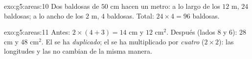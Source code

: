 \begin{solution}{exo:g5:areas:10}
Dos baldosas de $50$ cm hacen un metro: a lo largo de los $12$ m,
$24$ baldosas; a lo ancho de los $2$ m, $4$ baldosas. Total:
$24 \times 4 = 96$ baldosas.
\end{solution}

\begin{solution}{exo:g5:areas:11}
Antes:  $2 \times (4 + 3) = 14$ cm y  $12$ cm$^2$.
Después (lados $8$ y $6$):  $28$ cm y  $48$ cm$^2$.
El  se ha \emph{duplicado}; el  se ha multiplicado por
\emph{cuatro} ($2 \times 2$): las longitudes y las  no cambian de la misma
manera.
\end{solution}
